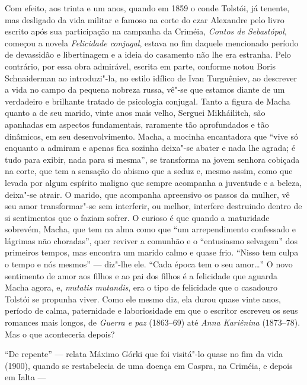 Com efeito, aos trinta e um anos, quando em 1859 o conde Tolstói,
já tenente, mas desligado da vida militar e famoso na corte do czar
Alexandre  pelo livro escrito após sua participação na campanha da
Criméia, \emph{Contos de Sebastópol}, começou a novela \emph{Felicidade
conjugal}, estava no fim daquele mencionado período de devassidão e
libertinagem e a ideia do casamento não lhe era estranha. Pelo
contrário, por essa obra admirável, escrita em parte, conforme notou
Boris Schnaiderman ao introduzi"-la, no estilo idílico de Ivan Turguêniev,
ao descrever a vida no campo da pequena nobreza russa, vê"-se que estamos
diante de um verdadeiro e brilhante tratado de psicologia conjugal.
Tanto a figura de Macha quanto a de seu marido, vinte anos mais velho,
Serguei Mikháilitch, são apanhadas em aspectos fundamentais,
raramente tão aprofundados e tão dinâmicos, em seu desenvolvimento.
Macha, a mocinha encantadora que ``vive só enquanto a admiram e apenas
fica sozinha deixa"-se abater e nada lhe agrada; é tudo para exibir, nada
para si mesma'', se transforma na jovem senhora cobiçada na corte, que
tem a sensação do abismo que a seduz e, mesmo assim, como que levada
por algum espírito maligno que sempre acompanha a juventude e a beleza,
deixa"-se atrair. O marido, que acompanha apreensivo os passos da mulher,
vê seu amor transformar"-se sem interferir, ou melhor, interfere
destruindo dentro de si sentimentos que o faziam sofrer. O curioso é que
quando a maturidade sobrevém, Macha, que tem na alma como que ``um
arrependimento confessado e lágrimas não choradas'', quer reviver a
comunhão e o ``entusiasmo selvagem'' dos primeiros
tempos, mas encontra um marido calmo e quase frio. ``Nisso tem culpa o
tempo e nós mesmos'' --- diz"-lhe ele. ``Cada época tem o seu amor\ldots{}'' O
novo sentimento de amor aos filhos e ao pai dos filhos é a
felicidade que aguarda Macha agora, e, \emph{mutatis mutandis}, era o
tipo de felicidade que o casadouro Tolstói se propunha viver. Como ele
mesmo diz, ela durou quase vinte anos, período de calma, paternidade e
laboriosidade em que o escritor escreveu os seus romances mais longos,
de \emph{Guerra e paz} (1863--69) até \emph{Anna Kariênina} (1873--78).
Mas o que aconteceria depois?

``De repente'' --- relata Máximo Górki que foi visitá"-lo quase no fim
da vida (1900), quando se restabelecia de uma doença em Caspra,
na Criméia, e depois em Ialta ---

